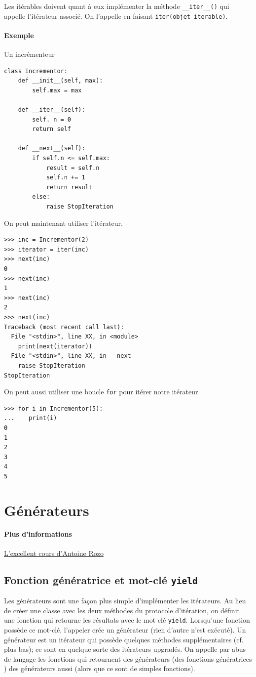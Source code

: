 \documentclass[a4paper, 10pt]{article}
\begin{document}
Les itérables doivent quant à eux implémenter la méthode \texttt{__iter__()} qui appelle l'itérateur associé. On l'appelle en faisant \texttt{iter(objet_iterable)}.

\paragraph{Exemple} Un incrémenteur
\begin{verbatim}
class Incrementor:
    def __init__(self, max):
        self.max = max

    def __iter__(self):
        self. n = 0
        return self

    def __next__(self):
        if self.n <= self.max:
            result = self.n
            self.n += 1
            return result
        else:
            raise StopIteration
\end{verbatim}
On peut maintenant utiliser l'itérateur.
\begin{verbatim}
>>> inc = Incrementor(2)
>>> iterator = iter(inc)
>>> next(inc)
0
>>> next(inc)
1
>>> next(inc)
2
>>> next(inc)
Traceback (most recent call last):
  File "<stdin>", line XX, in <module>
    print(next(iterator))
  File "<stdin>", line XX, in __next__
    raise StopIteration
StopIteration
\end{verbatim}
On peut aussi utiliser une boucle \texttt{for} pour itérer notre itérateur.
\begin{verbatim}
>>> for i in Incrementor(5):
...    print(i)
0
1
2
3
4
5
\end{verbatim}

\section{Générateurs}

\paragraph{Plus d'informations} \href{https://zestedesavoir.com/tutoriels/954/notions-de-python-avancees/3-further/1-generators/}{L'excellent cours d'Antoine Rozo}
\subsection{Fonction génératrice et mot-clé \texttt{yield}}

Les générateurs sont une façon plus simple d'implémenter les itérateurs. Au lieu de créer une classe avec les deux méthodes du protocole d'itération, on définit une fonction qui retourne les résultats avec le mot clé \texttt{yield}. Lorsqu'une fonction possède ce mot-clé, l'appeler crée un générateur (rien d'autre n'est exécuté). Un générateur est un itérateur qui possède quelques méthodes supplémentaires (cf. plus bas); ce sont en quelque sorte des itérateurs upgradés. On appelle par abus de langage les fonctions qui retournent des générateurs (des \og fonctions génératrices \fg{}) des générateurs aussi (alors que ce sont de simples fonctions).\bigskip
\end{document}
